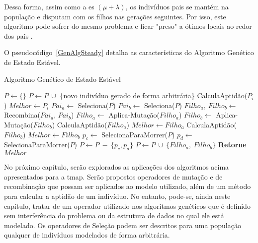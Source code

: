 Dessa forma, assim como a \ac{es} $( \mu + \lambda )$, os indivíduos pais se 
mantém na população e disputam com os filhos nas gerações seguintes. Por isso, 
este algoritmo pode sofrer do mesmo problema e ficar "preso" a ótimos locais ao 
redor dos pais \citep{Luke2013Metaheuristics}.

O pseudocódigo~\ref{GenAlgSteady} detalha as características do Algoritmo 
Genético de Estado Estável.

\begin{algorithm}                      %
	\caption{Algoritmo Genético de Estado Estável}          %
	\label{GenAlgSteady}                           %
	\begin{algorithmic}                   %
		\State $P \gets \{\} $
			\State $P \gets P \ \cup $ \{novo indivíduo gerado de forma arbitrária\} 
		\EndFor
			\State CalculaAptidão($P_{i}$)
				\State $Melhor \gets P_{i}$
			\EndIf
		\EndFor
		\Repeat
			\State $Pai_{a} \gets $ Seleciona($P$)
			\State $Pai_{b} \gets $ Seleciona($P$)
			\State $Filho_{a},\ Filho_{b} \gets $ Recombina($Pai_{a}$, $Pai_{b}$)
			\State $Filho_{a} \gets $ Aplica-Mutação($Filho_{a}$)
			\State $Filho_{b} \gets $ Aplica-Mutação($Filho_{b}$)
			\State CalculaAptidão($Filho_{a}$)
				\State $Melhor \gets Filho_{a}$
			\EndIf
			\State CalculaAptidão($Filho_{b}$)
				\State $Melhor \gets Filho_{b}$
			\EndIf
			\State $p_{c} \gets $ SelecionaParaMorrer($P$) 
			\State $p_{d} \gets $ SelecionaParaMorrer($P$) 
			\State $P \gets P\ -\ \{p_{c},p_{d}\}$
			\State $P \gets P\ \cup\ \{Filho_{a},\ Filho_{b}\}$
		\State \textbf{Retorne} $Melhor$
		\EndProcedure
	\end{algorithmic}
\end{algorithm}

No próximo capítulo, serão explorados as aplicações dos algoritmos acima 
apresentados para a \ac{tmap}. Serão propostos operadores de mutação e de 
recombinação que possam ser aplicados ao modelo utilizado, além de um método 
para calcular a aptidão de um indivíduo. No entanto, pode-se, ainda neste 
capítulo, tratar de um operador utilizado nos algoritmos genéticos que é 
definido sem interferência do problema ou da estrutura de dados no qual ele 
está modelado. Os operadores de Seleção podem ser descritos para uma população 
qualquer de indivíduos modelados de forma arbitrária.


